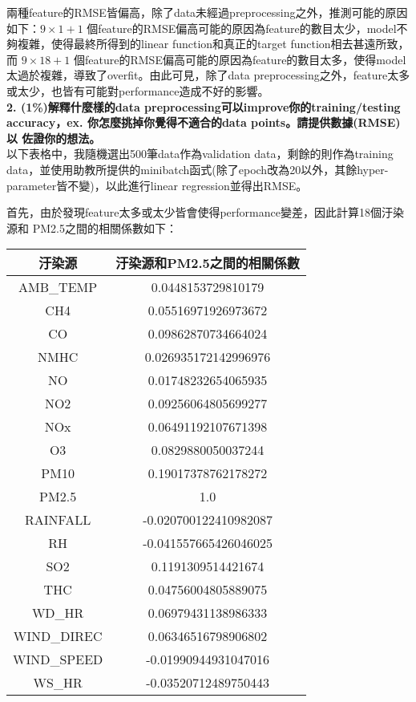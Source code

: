 \documentclass{article}
\begin{document}
兩種feature的RMSE皆偏高，除了data未經過preprocessing之外，推測可能的原因如下：$9 \times 1 + 1$ 個feature的RMSE偏高可能的原因為feature的數目太少，model不
夠複雜，使得最終所得到的linear function和真正的target function相去甚遠所致，而 $9 \times 18 + 1$ 個feature的RMSE偏高可能的原因為feature的數目太多，使得model太過於複雜，導致了overfit。由此可見，除了data preprocessing之外，feature太多或太少，也皆有可能對performance造成不好的影響。\\

\noindent
{\bf 2. (1\%)解釋什麼樣的data preprocessing可以improve你的training/testing
accuracy，ex. 你怎麼挑掉你覺得不適合的data points。請提供數據(RMSE)以
佐證你的想法。}\\

以下表格中，我隨機選出500筆data作為validation data，剩餘的則作為training data，並使用助教所提供的minibatch函式(除了epoch改為20以外，其餘hyper-parameter皆不變)，以此進行linear regression並得出RMSE。

首先，由於發現feature太多或太少皆會使得performance變差，因此計算18個汙染源和 PM2.5之間的相關係數如下：

\begin{center}
    \begin{tabular}{|c|c|}
        \hline
        汙染源 & 汙染源和PM2.5之間的相關係數\\
        \hline
        AMB\_TEMP & 0.0448153729810179\\
        \hline
        CH4 & 0.05516971926973672\\
        \hline
        CO & 0.09862870734664024\\
        \hline
        NMHC & 0.026935172142996976\\
        \hline
        NO & 0.01748232654065935\\
        \hline
        NO2 & 0.09256064805699277\\
        \hline
        NOx & 0.06491192107671398\\
        \hline
        O3 & 0.0829880050037244\\
        \hline
        PM10 & 0.19017378762178272\\
        \hline
        PM2.5 & 1.0\\
        \hline
        RAINFALL & -0.020700122410982087\\
        \hline
        RH & -0.041557665426046025\\
        \hline
        SO2 & 0.1191309514421674\\
        \hline
        THC & 0.04756004805889075\\
        \hline
        WD\_HR & 0.06979431138986333\\
        \hline
        WIND\_DIREC & 0.06346516798906802\\
        \hline
        WIND\_SPEED & -0.01990944931047016\\
        \hline
        WS\_HR & -0.03520712489750443\\
        \hline
    \end{tabular}
\end{center}
\end{document}
